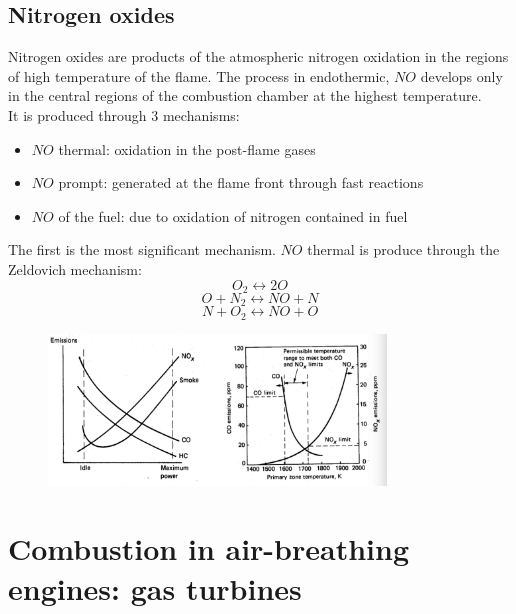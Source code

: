 \documentclass[12pt]{article}
\begin{document}
\subsection{Nitrogen oxides}

Nitrogen oxides are products of the atmospheric nitrogen oxidation in the regions of high temperature of the flame. The process in endothermic, $NO$ develops only in the central regions of the combustion chamber at the highest temperature.\\
It is produced through 3 mechanisms:
\begin{itemize}
    \item $NO$ thermal: oxidation in the post-flame gases
    \item $NO$ prompt: generated at the flame front through fast reactions
    \item $NO$ of the fuel: due to oxidation of nitrogen contained in fuel
\end{itemize}

The first is the most significant mechanism. $NO$ thermal is produce through the Zeldovich mechanism:
\begin{equation}
    O_{2} \leftrightarrow 2O
\end{equation}
\begin{equation}
    O + N_{2} \leftrightarrow NO + N
\end{equation}
\begin{equation}
    N + O_{2} \leftrightarrow NO + O
\end{equation}

\begin{figure}[!ht]
\centering
\includegraphics[width=0.8\textwidth]{figures/pollutants.png}
\end{figure}

\newpage

\section{Combustion in air-breathing engines: gas turbines}
\end{document}
